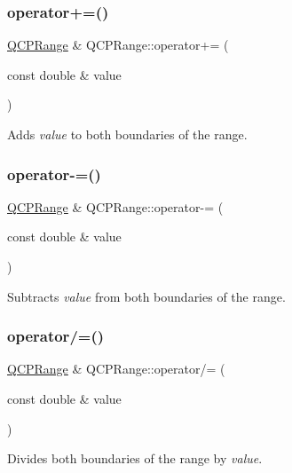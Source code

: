 \subsubsection{\texorpdfstring{operator+=()}{operator+=()}}
{\footnotesize\ttfamily \mbox{\hyperlink{class_q_c_p_range}{Q\+C\+P\+Range}} \& Q\+C\+P\+Range\+::operator+= (\begin{DoxyParamCaption}\item[{const double \&}]{value }\end{DoxyParamCaption})\hspace{0.3cm}{\ttfamily [inline]}}

Adds {\itshape value} to both boundaries of the range. \mbox{\label{class_q_c_p_range_a95894bcb15a16a75ca564091374e2191}} 
\subsubsection{\texorpdfstring{operator-\/=()}{operator-=()}}
{\footnotesize\ttfamily \mbox{\hyperlink{class_q_c_p_range}{Q\+C\+P\+Range}} \& Q\+C\+P\+Range\+::operator-\/= (\begin{DoxyParamCaption}\item[{const double \&}]{value }\end{DoxyParamCaption})\hspace{0.3cm}{\ttfamily [inline]}}

Subtracts {\itshape value} from both boundaries of the range. \mbox{\label{class_q_c_p_range_a6137d8682b6835ace840730b4c1e2d63}} 
\subsubsection{\texorpdfstring{operator/=()}{operator/=()}}
{\footnotesize\ttfamily \mbox{\hyperlink{class_q_c_p_range}{Q\+C\+P\+Range}} \& Q\+C\+P\+Range\+::operator/= (\begin{DoxyParamCaption}\item[{const double \&}]{value }\end{DoxyParamCaption})\hspace{0.3cm}{\ttfamily [inline]}}

Divides both boundaries of the range by {\itshape value}. \mbox{\label{class_q_c_p_range_a9f8d1fdcf4b6d19779f1c3d9a14b09c9}} 
